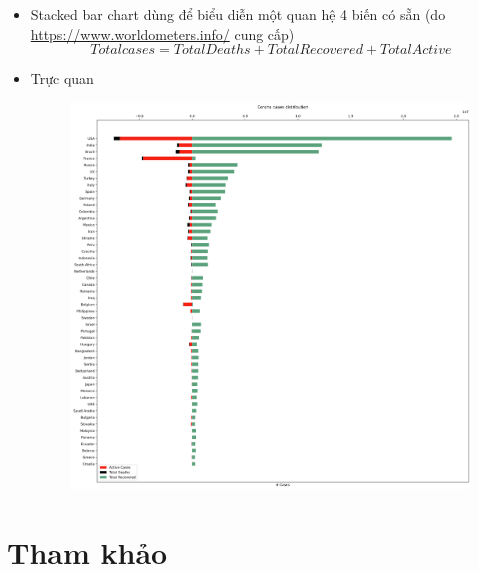 \documentclass[a4paper, 12pt]{article}
\begin{document}
    \begin{itemize}
        \item Stacked bar chart dùng để biểu diễn một quan hệ 4 biến có sẵn (do \url{https://www.worldometers.info/} cung cấp)
        \begin{equation}
            Total cases = Total Deaths + Total Recovered + Total Active
        \end{equation}

        \item Trực quan
        \begin{figure}[H]
            \begin{center}
                \includegraphics[scale=0.25]{img/stackedBar.png}
            \end{center}
        \end{figure}
    \end{itemize}

    \clearpage

    \section{Tham khảo}
    \clearpage
\end{document}
